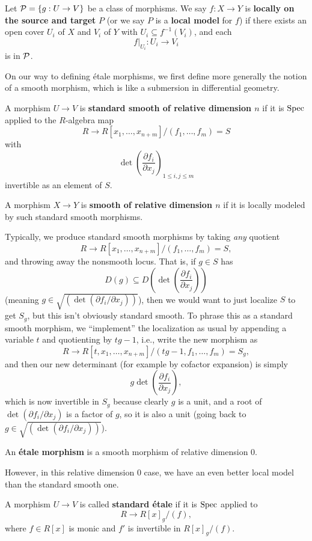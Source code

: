 \documentclass[12pt]{article}
\begin{document}
\begin{defn}
    Let $\mathcal{P}=\{g:U\to V\}$ be a class of morphisms. We say $f:X\to Y$ is \textbf{locally on the source and target} $P$ (or we say $P$ is a \textbf{local model} for $f$) if there exists an open cover $U_i$ of $X$ and $V_i$ of $Y$ with $U_i\subseteq f^{-1}(V_i)$, and each
    \[f|_{U_i}: U_i \to V_i\]
    is in $\mathcal{P}$. 
\end{defn}

On our way to defining \'etale morphisms, we first define more generally the notion of a smooth morphism, which is like a submersion in differential geometry.

\begin{defn}
    A morphism $U\to V$ is \textbf{standard smooth of relative dimension $n$} if it is $\operatorname{Spec}$ applied to the $R$-algebra map
    \[R \to R[x_1,\dots,x_{n+m}]/(f_1,\dots,f_m)=S\]
    with
    \[\det\left(\frac{\partial f_i}{\partial x_j}\right)_{1 \leq i,j\leq m}\]
    invertible as an element of $S$.

    A morphism $X\to Y$ is \textbf{smooth of relative dimension $n$} if it is locally modeled by such standard smooth morphisms.
\end{defn}

Typically, we produce standard smooth morphisms by taking \textit{any} quotient
\[R\to R[x_1,\dots,x_{n+m}]/(f_1,\dots,f_m)=S,\]
and throwing away the nonsmooth locus. That is, if $g\in S$ has
\[D(g)\subseteq D(\det(\frac{\partial f_i}{\partial x_j}))\]
(meaning $g\in \sqrt{(\det(\partial f_i/\partial x_j))}$), then we would want to just localize $S$ to get $S_g$, but this isn't obviously standard smooth. To phrase this as a standard smooth morphism, we ``implement'' the localization as usual by appending a variable $t$ and quotienting by $tg-1$, i.e., write the new morphism as
\[R\to R[t,x_1,\dots,x_{n+m}]/(tg-1,f_1,\dots,f_m)=S_g,\]
and then our new determinant (for example by cofactor expansion) is simply
\[g \det(\frac{\partial f_i}{\partial x_j}),\]
which is now invertible in $S_g$ because clearly $g$ is a unit, and a root of $\det(\partial f_i/\partial x_j)$ is a factor of $g$, so it is also a unit (going back to $g\in \sqrt{(\det(\partial f_i/\partial x_j))}$).

\begin{defn}
    An \textbf{\'etale morphism} is a smooth morphism of relative dimension 0.
\end{defn}

However, in this relative dimension 0 case, we have an even better local model than the standard smooth one.
\begin{defn}
    A morphism $U\to V$ is called \textbf{standard \'etale} if it is $\operatorname{Spec}$ applied to
    \[R\to R[x]_g/(f),\]
    where $f\in R[x]$ is monic and $f'$ is invertible in $R[x]_g/(f)$.
\end{defn}
\end{document}
